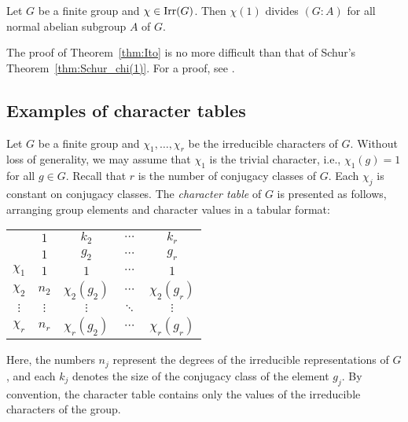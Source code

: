 \begin{theorem}[It\^o]
\label{thm:Ito}
Let $G$ be a finite group and $\chi\in\operatorname{Irr}(G)$. Then 
$\chi(1)$ divides $(G:A)$ for all normal abelian subgroup $A$ of $G$.  
\end{theorem}

The proof of Theorem~\ref{thm:Ito} is no more difficult than that of Schur's Theorem~\ref{thm:Schur_chi(1)}. For a proof, see \cite[\S8.1]{MR0450380}.


\subsection{Examples of character tables}

Let $G$ be a finite group and $\chi_1,\dots,\chi_r$ be the irreducible characters of $G$. Without loss of generality, 
we may assume that $\chi_1$ is the trivial character, i.e.,  $\chi_1(g)=1$ for all $g\in G$. 
Recall that $r$ is the number of conjugacy classes of $G$. Each $\chi_j$ is constant on conjugacy classes. 
The \emph{character table} of $G$ is presented as follows, arranging group elements and character values in a tabular format:
\bigskip 
\begin{center}
\begin{tabular}{|c|cccc|}
\hline 
 & $1$ & $k_{2}$ & $\cdots$ & $k_{r}$\tabularnewline
 & $1$ & $g_{2}$ & $\cdots$ & $g_{r}$\tabularnewline
\hline 
$\chi_{1}$ & $1$ & $1$ & $\cdots$ & $1$\tabularnewline
$\chi_{2}$ & $n_{2}$ & $\chi_{2}(g_{2})$ & $\cdots$ & $\chi_{2}(g_{r})$\tabularnewline
$\vdots$ & $\vdots$ & $\vdots$ & $\ddots$ & $\vdots$\tabularnewline
$\chi_{r}$ & $n_{r}$ & $\chi_{r}(g_{2})$ & $\cdots$ & $\chi_{r}(g_{r})$\tabularnewline
\hline
\end{tabular}
\end{center}
\bigskip 
Here, the numbers $n_j$ represent the degrees of the irreducible representations of $G$, and each $k_j$ denotes  
the size of the conjugacy class of the element $g_j$. By convention, the character table
contains only the values of the irreducible characters of the group. 

